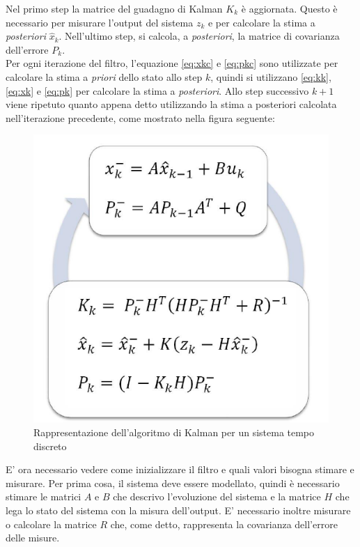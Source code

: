 Nel primo step la matrice del guadagno di Kalman $K_k$ è aggiornata. Questo è necessario per misurare l'output del sistema $z_k$ e per calcolare la stima a \textit{posteriori} $\hat{x}_k$. Nell'ultimo step, si calcola, a \textit{posteriori}, la matrice di covarianza dell'errore $P_k$. \\
Per ogni iterazione del filtro, l'equazione \ref{eq:xkc} e  \ref{eq:pkc} sono utilizzate per calcolare la stima a \textit{priori} dello stato allo step $k$, quindi si utilizzano \ref{eq:kk}, \ref{eq:xk} e \ref{eq:pk} per calcolare la stima a \textit{posteriori}. Allo step successivo $k+1$ viene ripetuto quanto appena detto utilizzando la stima a posteriori calcolata nell'iterazione precedente, come mostrato nella figura seguente:
\begin{figure}[H]  
	\centering 
	\includegraphics[scale=0.8]{kalman/kalmanfilter.png}
	\caption{Rappresentazione dell'algoritmo di Kalman per un sistema tempo discreto}
	\label{fig:kalmanfilter}
\end{figure}
E' ora necessario vedere come inizializzare il filtro e quali valori bisogna stimare e misurare. Per prima cosa, il sistema deve essere modellato, quindi è necessario stimare le matrici $A$ e $B$ che descrivo l'evoluzione del sistema e la matrice $H$ che lega lo stato del sistema con la misura dell'output. E' necessario inoltre misurare o calcolare la matrice $R$ che, come detto, rappresenta la covarianza dell'errore delle misure. \\
